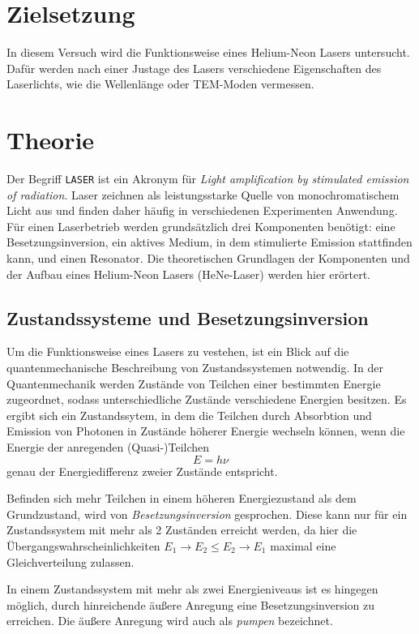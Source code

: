 \section{Zielsetzung}
In diesem Versuch wird die Funktionsweise eines Helium-Neon Lasers untersucht. Dafür werden nach einer Justage des Lasers 
verschiedene Eigenschaften des Laserlichts, wie die Wellenlänge oder TEM-Moden vermessen.

\section{Theorie}
\label{sec:Theorie}

Der Begriff \texttt{LASER} ist ein Akronym für \textit{Light amplification by stimulated emission of radiation}. Laser zeichnen als
leistungsstarke Quelle von monochromatischem Licht aus und finden daher häufig in verschiedenen Experimenten Anwendung. Für einen Laserbetrieb werden grundsätzlich
drei Komponenten benötigt: eine Besetzungsinversion, ein aktives Medium, in dem stimulierte Emission stattfinden kann, und einen Resonator. Die theoretischen
Grundlagen der Komponenten und der Aufbau eines Helium-Neon Lasers (HeNe-Laser) werden hier erörtert.

\subsection{Zustandssysteme und Besetzungsinversion}
Um die Funktionsweise eines Lasers zu vestehen, ist ein Blick auf die quantenmechanische Beschreibung von Zustandssystemen notwendig.
In der Quantenmechanik werden Zustände von Teilchen einer bestimmten Energie zugeordnet, sodass unterschiedliche Zustände verschiedene
Energien besitzen. Es ergibt sich ein Zustandssytem, in dem die Teilchen durch Absorbtion und Emission von Photonen in Zustände höherer Energie wechseln können,
wenn die Energie der anregenden (Quasi-)Teilchen
\begin{equation}
    E = h\nu
\end{equation}
genau der Energiedifferenz zweier Zustände entspricht.

Befinden sich mehr Teilchen in einem höheren Energiezustand als dem Grundzustand, wird von \textit{Besetzungsinversion} gesprochen. Diese kann
nur für ein Zustandssystem mit mehr als 2 Zuständen erreicht werden, da hier die Übergangswahrscheinlichkeiten $E_1 \rightarrow E_2 ≤ E_2 \rightarrow E_1$
maximal eine Gleichverteilung zulassen.

In einem Zustandssystem mit mehr als zwei Energieniveaus ist es hingegen möglich, durch hinreichende äußere Anregung eine Besetzungsinversion zu erreichen. 
Die äußere Anregung wird auch als \textit{pumpen} bezeichnet.

